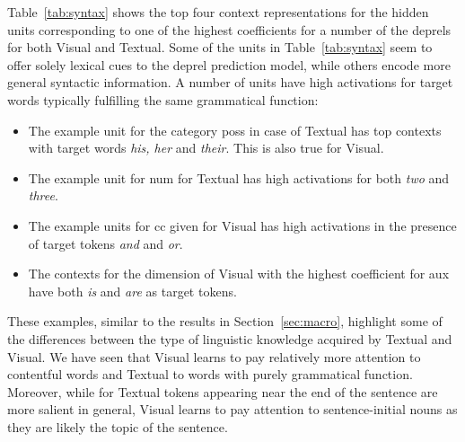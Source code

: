 Table~\ref{tab:syntax} shows the top four context representations for the hidden units 
corresponding to one of the highest coefficients for a number of the deprels for both 
{\sc Visual} and {\sc Textual}. Some of the units in Table~\ref{tab:syntax} seem to offer 
solely lexical cues to the deprel prediction model, while others encode more general 
syntactic information. A number of units have high activations for target words typically 
fulfilling the same grammatical function:
\begin{itemize}
    \item The example unit for the category {\sc poss} in case of {\sc Textual} has top contexts with target words {\it his, her} and {\it their}. This is also true for {\sc Visual}.
    \item The example unit for {\sc num} for {\sc Textual} has high activations for both {\it two} and {\it three}.
    \item The example units for {\sc cc} given for {\sc Visual} has high activations in the presence of target tokens {\it and} and {\it or}.
    \item The contexts for the dimension of {\sc Visual} with the highest coefficient for {\sc aux} have both {\it is} and {\it are} as target tokens.
\end{itemize}

\noindent These examples, similar to the results in Section~\ref{sec:macro}, 
highlight some of the differences between the type of linguistic 
knowledge acquired by {\sc Textual} and {\sc Visual}. We have
seen that {\sc Visual} learns to pay relatively more attention to contentful words
and {\sc Textual} to words with purely grammatical function. Moreover,
while for {\sc Textual} tokens appearing near the end of the sentence
are more salient in general, {\sc Visual} learns to pay attention to
sentence-initial nouns as they are likely the {\sc topic} of the
sentence. 

